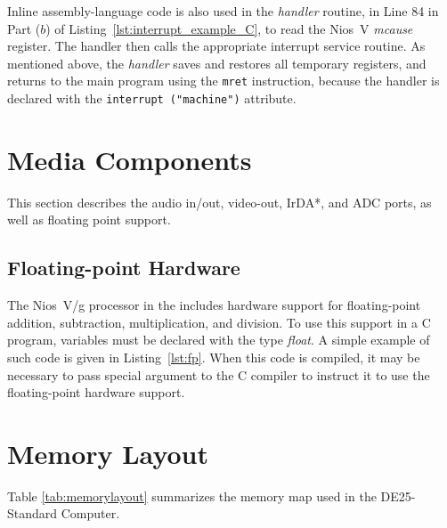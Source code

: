 \documentclass[11pt, twoside, pdftex]{article}
\newcommand{\commonFiles}{../../../common/doc}
\newcommand{\systemName}{DE25-Standard Computer}
\begin{document}
Inline assembly-language code is also used in the {\it handler} routine, in Line 84 in 
Part ($b$) of Listing~\ref{lst:interrupt_example_C}, to read the Nios~V {\it mcause} register.
The handler then calls the appropriate interrupt service routine. As mentioned above, the
{\it handler} saves and restores all temporary registers, and returns to the main program 
using the \texttt{mret} instruction, because the
handler is declared with the \texttt{interrupt ("machine")} attribute.

\section{Media Components}
\label{sec:multi}

This section describes the audio in/out, video-out, IrDA*, and ADC ports,
as well as floating point support.






\subsection{Floating-point Hardware}
\label{sec:fp}

The Nios~V/g processor in the includes hardware support for
floating-point addition, subtraction, multiplication, and division. To use this support in
a C program, variables must be declared with the type {\it float}. A simple example of 
such code is given in Listing~\ref{lst:fp}. When this code is compiled, it may be necessary 
to pass special argument to the C compiler to instruct it to 
use the floating-point hardware support.





\section{Memory Layout}

\noindent
Table \ref{tab:memorylayout} summarizes the memory map used in the \systemName.
~\\
~\\
\end{document}
